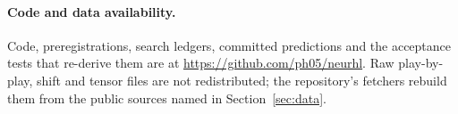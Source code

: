 \paragraph{Code and data availability.}
Code, preregistrations, search ledgers, committed predictions and the
acceptance tests that re-derive them are at
\url{https://github.com/ph05/neurhl}. Raw play-by-play, shift and tensor files
are not redistributed; the repository's fetchers rebuild them from the public
sources named in Section~\ref{sec:data}.

